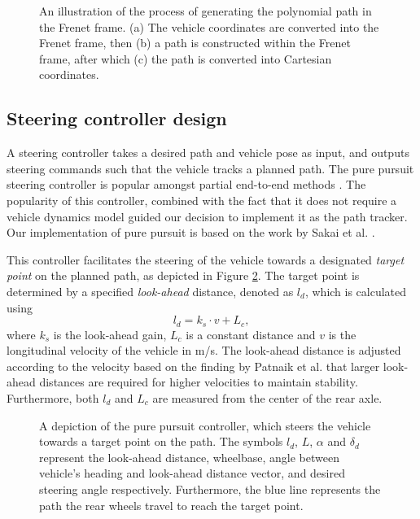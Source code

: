 \begin{figure}[htb!]
    \centering
    
    \caption[Generating the path in the Frenet frame]{An illustration of the process of generating the polynomial path in the Frenet frame. (a) The vehicle coordinates are converted into the Frenet frame, then (b) a path is constructed within the Frenet frame, after which (c) the path is converted into Cartesian coordinates.}
    \label{fig:polynomial_path_generation}
\end{figure}


\subsection{Steering controller design}

A steering controller takes a desired path and vehicle pose as input, and outputs steering commands such that the vehicle tracks a planned path. 
The pure pursuit steering controller is popular amongst partial end-to-end methods \cite{Evans2021b, Weiss2020}.
The popularity of this controller, combined with the fact that it does not require a vehicle dynamics model guided our decision to implement it as the path tracker.
Our implementation of pure pursuit is based on the work by Sakai et al. \cite{Sakai2018}.


This controller facilitates the steering of the vehicle towards a designated \emph{target point} on the planned path, as depicted in Figure \ref{fig:pure_pursuit}. 
The target point is determined by a specified \emph{look-ahead} distance, denoted as $l_d$, which is calculated using
\begin{equation}\label{eq:l_d}
    l_d = k_s \cdot v + L_{c},
\end{equation}
where $k_s$ is the look-ahead gain, $L_{c}$ is a constant distance and $v$ is the longitudinal velocity of the vehicle in m/s. 
The look-ahead distance is adjusted according to the velocity based on the finding by Patnaik et al. \cite{Patnaik2020} that larger look-ahead distances are required for higher velocities to maintain stability.
Furthermore, both $l_d$ and $L_c$ are measured from the center of the rear axle.

\begin{figure}[htb!]
    \centering
    
    \caption[A depiction of the pure pursuit controller]{A depiction of the pure pursuit controller, which steers the vehicle towards a target point on the path. The symbols $l_d$, $L$, $\alpha$ and $\delta_{d}$ represent the look-ahead distance, wheelbase, angle between vehicle's heading and look-ahead distance vector, and desired steering angle respectively. Furthermore, the blue line represents the path the rear wheels travel to reach the target point.}
    \label{fig:pure_pursuit}
\end{figure}

